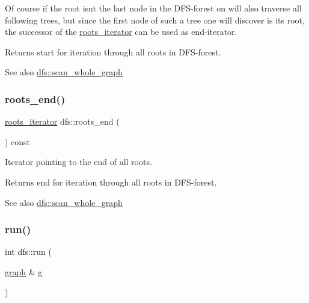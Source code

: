 Of course if the root isn\textquotesingle{}t the last node in the D\+F\+S-\/forest on will also traverse all following trees, but since the first node of such a tree one will discover is its root, the successor of the \mbox{\hyperlink{classdfs_a17cb59c8a1fead11fa6b0c85cf5a478e}{roots\+\_\+iterator}} can be used as end-\/iterator.

\begin{DoxyReturn}{Returns}
start for iteration through all roots in D\+F\+S-\/forest. 
\end{DoxyReturn}
\begin{DoxySeeAlso}{See also}
\mbox{\hyperlink{classdfs_aa7c864a6f3a120720138b187b3ed95b5}{dfs\+::scan\+\_\+whole\+\_\+graph}} 
\end{DoxySeeAlso}
\mbox{\label{classdfs_ae1a61d8c2d8d99059cab410f766ec73f}} 
\subsubsection{\texorpdfstring{roots\+\_\+end()}{roots\_end()}}
{\footnotesize\ttfamily \mbox{\hyperlink{classdfs_a17cb59c8a1fead11fa6b0c85cf5a478e}{roots\+\_\+iterator}} dfs\+::roots\+\_\+end (\begin{DoxyParamCaption}{ }\end{DoxyParamCaption}) const\hspace{0.3cm}{\ttfamily [inline]}}



Iterator pointing to the end of all roots. 

\begin{DoxyReturn}{Returns}
end for iteration through all roots in D\+F\+S-\/forest. 
\end{DoxyReturn}
\begin{DoxySeeAlso}{See also}
\mbox{\hyperlink{classdfs_aa7c864a6f3a120720138b187b3ed95b5}{dfs\+::scan\+\_\+whole\+\_\+graph}} 
\end{DoxySeeAlso}
\mbox{\label{classdfs_af0863b8974d5fd58cd0375c78ed8163b}} 
\subsubsection{\texorpdfstring{run()}{run()}}
{\footnotesize\ttfamily int dfs\+::run (\begin{DoxyParamCaption}\item[{\mbox{\hyperlink{classgraph}{graph}} \&}]{g }\end{DoxyParamCaption})\hspace{0.3cm}{\ttfamily [virtual]}}



